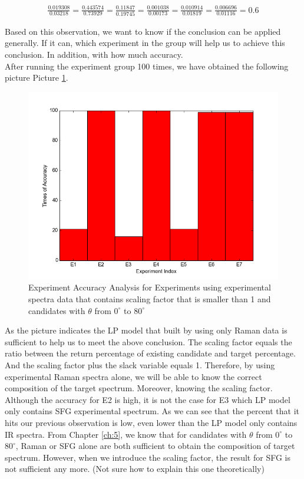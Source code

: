 \begin{eqnarray} \label{eqn:6.3}
\frac{0.019308}{0.03218} = \frac{0.443574}{0.73929} = \frac{0.11847}{0.19745} =\frac{0.001038}{0.00173}  = \frac{0.010914}{0.01819} = \frac{0.006696}{0.01116} = 0.6
\end{eqnarray}

Based on this observation, we want to know if the conclusion can be applied generally. If it can, which experiment in the group will help us to achieve this conclusion. In addition, with how much accuracy. \\

After running the experiment group 100 times, we have obtained the following picture Picture \ref{fig:6.1}.\\

\begin{figure}[!ht] 
\centering
\includegraphics[scale=0.3]{Figures/chapter6_1.png}
\caption{Experiment Accuracy Analysis for Experiments using experimental spectra data that contains scaling factor that is smaller than 1 and candidates with $\theta$ from $0^{\circ}$ to $80^{\circ}$}
\label{fig:6.1}
\end{figure}

As the picture indicates the LP model that built by using only Raman data is sufficient to help us to meet the above conclusion. The scaling factor equals the ratio between the return percentage of existing candidate and target percentage. And the scaling factor plus the slack variable equals 1. Therefore, by using experimental Raman spectra alone, we will be able to know the correct composition of the target spectrum. Moreover, knowing the scaling factor. \\
Although the accuracy for E2 is high, it is not the case for E3 which LP model only contains SFG experimental spectrum. As we can see that the percent that it hits our previous observation is low, even lower than the LP model only contains IR spectra. From Chapter \ref{ch:5}, we know that for candidates with $\theta$ from $0^{\circ}$ to $80^{\circ}$, Raman or SFG alone are both sufficient to obtain the composition of target spectrum. However, when we introduce the scaling factor, the result for SFG is not sufficient any more. (Not sure how to explain this one theoretically)\\

